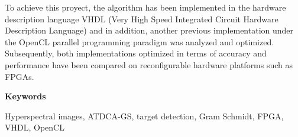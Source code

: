 To achieve this proyect, the algorithm has been implemented in the hardware description language VHDL (Very High Speed Integrated Circuit Hardware Description Language) and in addition, another previous implementation under the OpenCL parallel programming paradigm was analyzed and optimized. Subsequently, both implementations optimized in terms of accuracy and performance have been compared on reconfigurable hardware platforms such as FPGAs.




\vspace{0.8cm}


\begin{center}

{\bf \Large Keywords}

   \end{center}

Hyperspectral images, ATDCA-GS, target detection, Gram Schmidt, FPGA, VHDL, OpenCL

   \vspace{0.5cm}
  
   
\mbox{}
